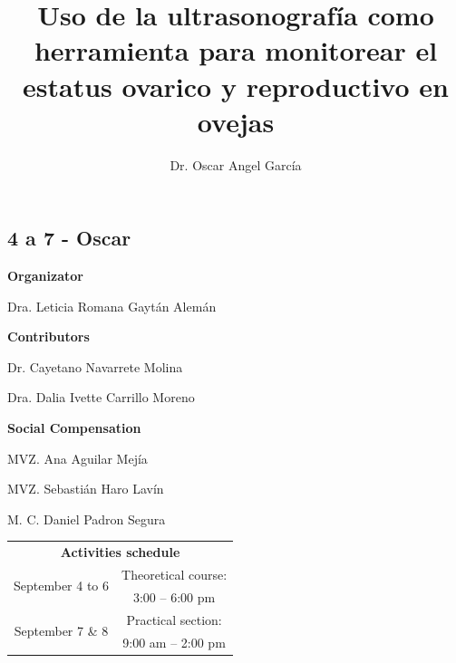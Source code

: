 {\hoffset=0pt

}

\newpage
\begin{wrap}
	\chapter{4 a 7 - Oscar}
\end{wrap}
\cero
\author{%
	Dr. Oscar Angel García
}
\corresponding{}{}
\title{Uso de la ultrasonografía como herramienta para monitorear el estatus ovarico y reproductivo en ovejas}

\maketitle

\begin{minipage}{0.45\textwidth}
	\centering
	\textbf{Organizator}
	
	Dra. Leticia Romana Gaytán Alemán
	
	\textbf{Contributors}
	
	Dr. Cayetano Navarrete Molina
	
	Dra. Dalia Ivette Carrillo Moreno
	
\end{minipage}%
\hfil%
\begin{minipage}{0.45\textwidth}
	\centering
	\textbf{Social Compensation}
	
	MVZ. Ana Aguilar Mejía
	
	MVZ. Sebastián Haro Lavín
	
	M. C. Daniel Padron Segura
	
\end{minipage}

\begin{table}[H]
	\centering
	\begin{tabular}{c|c}
		\multicolumn{2}{c}{\textbf{Activities schedule}} \\
		\multicolumn{1}{c|}{\multirow{2}{*}{September 4 to 6}} & Theoretical course: \\
		\multicolumn{1}{c|}{} & 3:00 -- 6:00 pm \\
		\multicolumn{1}{c|}{\multirow{2}{*}{September 7 \& 8}} & Practical section: \\
		\multicolumn{1}{c|}{} & 9:00 am -- 2:00 pm
	\end{tabular}
\end{table}


